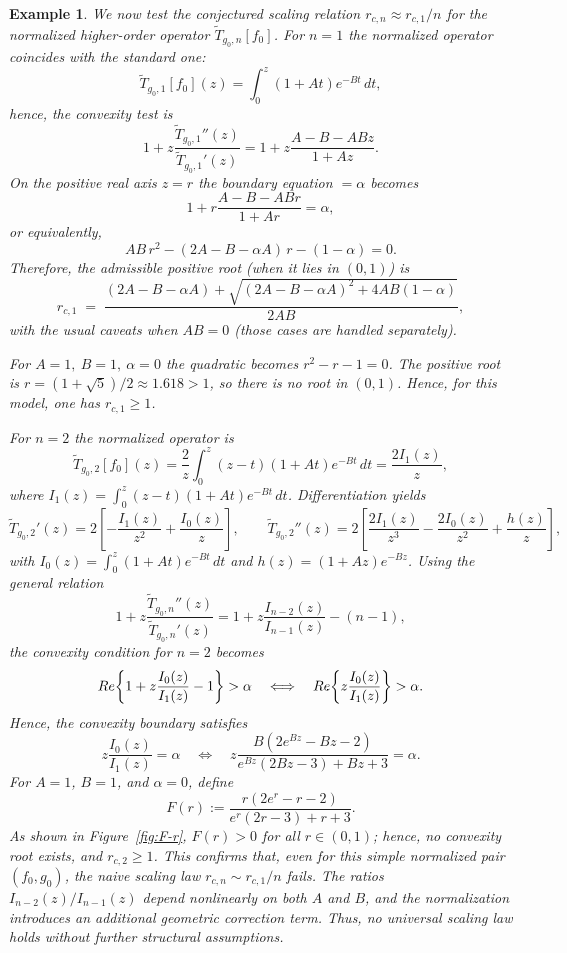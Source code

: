 \documentclass[12pt,a4paper]{amsart}
\numberwithin{equation}{section}
\newtheorem{example}{Example}[section]
\theoremstyle{remark}
\begin{document}
\begin{example}
We now test the conjectured scaling relation \(r_{c,n} \approx r_{c,1}/n\) 
for the normalized higher-order operator \(\widetilde{T}_{g_0,n}[f_0]\).
For \(n=1\) the normalized operator coincides with the standard one:
\[
\widetilde{T}_{g_0,1}[f_0](z)=\int_0^z (1+At)e^{-Bt}\,dt,
\]
hence, the convexity test is
\[
1+z\frac{\widetilde{T}_{g_0,1}''(z)}{\widetilde{T}_{g_0,1}'(z)}
=1+z\frac{A - B - AB z}{1+Az}.
\]
On the positive real axis \(z=r\) the boundary equation \(= \alpha\) becomes
\[
1 + r\frac{A - B - AB r}{1+Ar} = \alpha,
\]
or equivalently, 
\[
AB\,r^2 - (2A - B - \alpha A)\,r - (1-\alpha)=0.
\]
Therefore, the admissible positive root (when it lies in \((0,1)\)) is
\[
r_{c,1} \;=\; \frac{(2A - B - \alpha A) + \sqrt{(2A - B - \alpha A)^2 + 4AB(1-\alpha)}}{2AB},
\]
with the usual caveats when \(AB=0\) (those cases are handled separately).

For \(A=1,\ B=1,\ \alpha=0\) the quadratic becomes \(r^2 - r -1 = 0\). The positive root is \(r=(1+\sqrt5)/2\approx1.618>1\), so there is no root in \((0,1)\). Hence, for this model, one has \(r_{c,1}\ge1\).

\smallskip

For \(n=2\) the normalized operator is
\[
\widetilde{T}_{g_0,2}[f_0](z)
=\frac{2}{z}\int_0^z (z-t)(1+At)e^{-Bt}\,dt
= \frac{2 I_1(z)}{z},
\]
where \(I_1(z)=\int_0^z (z-t)(1+At)e^{-Bt}\,dt\). Differentiation yields
\[
\widetilde{T}_{g_0,2}'(z)
=2\!\left[-\frac{I_1(z)}{z^2}+\frac{I_0(z)}{z}\right],
\qquad
\widetilde{T}_{g_0,2}''(z)
=2\!\left[\frac{2I_1(z)}{z^3}-\frac{2I_0(z)}{z^2}+\frac{h(z)}{z}\right],
\]
with \(I_0(z)=\int_0^z(1+At)e^{-Bt}\,dt\) and \(h(z)=(1+Az)e^{-Bz}\). Using the general relation
\[
1+z\frac{\widetilde{T}_{g_0,n}''(z)}{\widetilde{T}_{g_0,n}'(z)}
=1+z\frac{I_{n-2}(z)}{I_{n-1}(z)}-(n-1),
\]
the convexity condition for \(n=2\) becomes
\[
{\rm Re}\!\left\{1+z\frac{I_0(z)}{I_1(z)}-1\right\}>\alpha
\quad\Longleftrightarrow\quad
{\rm Re}\!\left\{z\frac{I_0(z)}{I_1(z)}\right\}>\alpha.
\]
Hence, the convexity boundary satisfies
\[
z\frac{I_0(z)}{I_1(z)}=\alpha
\quad\Longleftrightarrow\quad
z\frac{B(2e^{Bz}-Bz-2)}{e^{Bz}(2Bz-3)+Bz+3}=\alpha.
\]
For \(A=1\), \(B=1\), and \(\alpha=0\), define
\[
F(r):=\frac{r(2e^{r}-r-2)}{e^{r}(2r-3)+r+3}.
\]
As shown in Figure~\ref{fig:F-r}, \(F(r)>0\) for all \(r\in(0,1)\); hence, no convexity root exists, and \(r_{c,2}\ge1\).
This confirms that, even for this simple normalized pair \((f_0,g_0)\),
the naive scaling law \(r_{c,n}\sim r_{c,1}/n\) fails.  
The ratios \(I_{n-2}(z)/I_{n-1}(z)\) depend nonlinearly on both \(A\) and \(B\),
and the normalization introduces an additional geometric correction term.
Thus, no universal scaling law holds without further structural assumptions.


\end{example}
\end{document}
